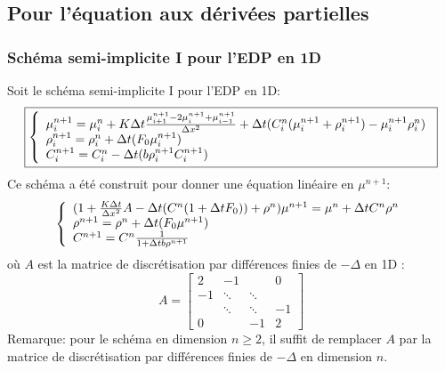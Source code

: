 \documentclass[11pt]{article}
\begin{document}
\subsection{Pour l'équation aux dérivées partielles}
\subsubsection{Schéma semi-implicite I pour l'EDP en 1D}
Soit le schéma semi-implicite I pour l'EDP en 1D:
\begin{equation} \boxed{\left\{
                \begin{array}{ll}
                   \mu^{n+1}_i = \mu^{n}_i+ K\Delta t \frac{\mu^{n+1}_{i+1}-2\mu^{n+1}_i+\mu^{n+1}_{i-1}}{\Delta x ^2} + \Delta t( C^{n}_i(\mu^{n+1}_i + \rho^{n+1}_i) -\mu^{n+1}_i\rho^{n}_i)\\
                \rho^{n+1}_i=  \rho^{n}_i+ \Delta t (F_0 \mu^{n+1}_i) \\
                 C^{n+1}_i =C^{n}_i- \Delta t(b\rho^{n+1}_iC^{n+1}_i)
                \end{array}
              \right.}
\end{equation}
Ce schéma a été construit pour donner une équation linéaire en $\mu^{n+1}$:
\begin{equation*} \left\{
                \begin{array}{ll}
                   (1+\frac{K\Delta t}{\Delta x^2}A-\Delta t(C^{n}(1+\Delta t F_0)) + \rho^{n})\mu^{n+1} = \mu^{n}+  \Delta t C^{n}\rho^{n} \\
                \rho^{n+1}=  \rho^{n}+ \Delta t (F_0 \mu^{n+1}) \\
                 C^{n+1} = C^{n}\frac{1}{1+ \Delta t b\rho^{n+1}}
                \end{array}
              \right.
\end{equation*}
où $A$ est la matrice de discrétisation par différences finies de $-\Delta$ en 1D
:\begin{equation}  \label{myeq}A= \left[ \begin{matrix}2 & -1 & & 0\\-1 & \ddots & \ddots &  \\& \ddots & \ddots &  -1 \\0 &  & -1 & 2  \end{matrix}  \right]\end{equation}
Remarque: pour le schéma en dimension $n\geq 2$, il suffit de remplacer $A$ par la matrice de discrétisation par différences finies de $-\Delta$ en dimension $n$.
\end{document}
